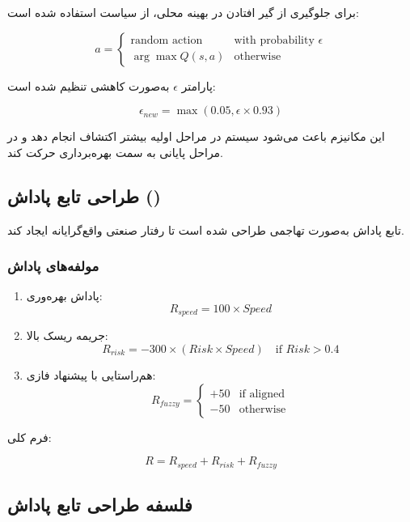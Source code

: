 \documentclass[a4paper, 10pt, twocolumn]{article}
\begin{document}
	برای جلوگیری از گیر افتادن در بهینه محلی، از سیاست  استفاده شده است:
	
	\[
	a =
	\begin{cases}
		\text{random action} & \text{with probability } \epsilon \\
		\arg\max Q(s,a) & \text{otherwise}
	\end{cases}
	\]
	
	پارامتر $\epsilon$ به‌صورت کاهشی تنظیم شده است:
	
	\[
	\epsilon_{new} = \max(0.05, \epsilon \times 0.93)
	\]
	
	این مکانیزم باعث می‌شود سیستم در مراحل اولیه بیشتر اکتشاف انجام دهد و در مراحل پایانی به سمت بهره‌برداری حرکت کند.
	
	\vspace{1em}
	
	
	\subsection{طراحی تابع پاداش ()}
	
	تابع پاداش به‌صورت تهاجمی طراحی شده است تا رفتار صنعتی واقع‌گرایانه ایجاد کند.
	
	\subsubsection*{مولفه‌های پاداش}
	
	\begin{enumerate}
		\item پاداش بهره‌وری:
		\[
		R_{speed} = 100 \times Speed
		\]
		
		\item جریمه ریسک بالا:
		\[
		R_{risk} = -300 \times (Risk \times Speed)
		\quad \text{if } Risk > 0.4
		\]
		
		\item هم‌راستایی با پیشنهاد فازی:
		\[
		R_{fuzzy} =
		\begin{cases}
			+50 & \text{if aligned} \\
			-50 & \text{otherwise}
		\end{cases}
		\]
	\end{enumerate}
	
	فرم کلی:
	
	\[
	R = R_{speed} + R_{risk} + R_{fuzzy}
	\]
	
	\vspace{1em}
	
	\subsection{فلسفه طراحی تابع پاداش}
	
\end{document}

